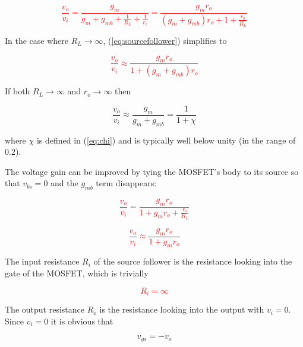 \textcolor{red}{
\begin{equation}
\frac{v_{o}}{v_{i}} = \frac{g_{m}}{g_{m} + g_{mb} + \frac{1}{R_{L}} + \frac{1}{r_{o}}} = \frac{g_{m}r_{o}}{(g_{m} + g_{mb})r_{o} + 1 + \frac{r_{o}}{R_{L}}}
\label{eq:sourcefollower}
\end{equation}
}

\noindent In the case where $R_{L} \rightarrow \infty$, (\ref{eq:sourcefollower}) simplifies to

\textcolor{red}{
\begin{equation}
\frac{v_{o}}{v_{i}} \approx \frac{g_{m}r_{o}}{1+(g_{m}+g_{mb})r_{o}}
\end{equation}
}

\noindent If both $R_{L} \rightarrow \infty$ and $r_{o} \rightarrow \infty$ then

\begin{equation}
\frac{v_{o}}{v_{i}} \approx \frac{g_{m}}{g_{m}+g_{mb}} = \frac{1}{1+\chi}
\end{equation}

\noindent where $\chi$ is defined in (\ref{eq:chi}) and is typically well below unity (in the range of 0.2).
\par
The voltage gain can be improved by tying the MOSFET's body to its source so that $v_{bs} = 0$ and the $g_{mb}$ term disappears:

\textcolor{red}{
\begin{equation}
\frac{v_{o}}{v_{i}} = \frac{g_{m}r_{o}}{1+g_{m}r_{o} + \frac{r_{o}}{R_{L}}}
\label{eq:sourcefollower_no_gmb}
\end{equation}
}

\textcolor{red}{
\begin{equation}
\frac{v_{o}}{v_{i}} \approx \frac{g_{m}r_{o}}{1+g_{m}r_{o}}
\end{equation}
}

The input resistance $R_{i}$ of the source follower is the resistance looking into the gate of the MOSFET, which is trivially

\textcolor{red}{
\begin{equation}
R_{i} = \infty
\end{equation}
}

The output resistance $R_{o}$ is the resistance looking into the output with $v_{i} = 0$. Since $v_{i} = 0$ it is obvious that

\begin{equation}
v_{gs} = -v_{o}
\end{equation}

